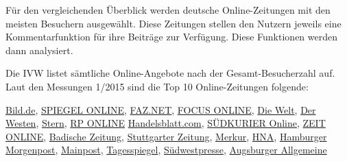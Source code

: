 Für den vergleichenden Überblick werden deutsche Online-Zeitungen mit den meisten Besuchern
ausgewählt. Diese Zeitungen stellen den Nutzern jeweils eine Kommentarfunktion für ihre Beiträge zur Verfügung. 
Diese Funktionen werden dann analysiert. 
  
Die IVW listet sämtliche Online-Angebote nach der Gesamt-Besucherzahl auf.
Laut den Messungen 1/2015 sind die \glqq Top 10 Online-Zeitungen\grqq\- folgende:

\href{http://www.Bild.de}{Bild.de},
\href{http://www.spiegel.de}{SPIEGEL ONLINE}, 
\href{http://www.FAZ.NET}{FAZ.NET},
\href{http://www.focus.de}{FOCUS ONLINE},
\href{http://www.welt.de}{Die Welt}, 
\href{http://www.derwesten.de}{Der Westen},
\href{http://www.stern.de}{Stern},
\href{http://www.rp-online.de}{RP ONLINE}
\href{http://www.Handelsblatt.com}{Handelsblatt.com},
\href{http://www.südkurier.de}{SÜDKURIER Online},
\href{http://www.zeit.de}{ZEIT ONLINE}, 
\href{http://www.Badische-Zeitung.de}{Badische Zeitung},
\href{http://www.stuttgarter-zeitung.de}{Stuttgarter Zeitung},
\href{http://www.merkur-online.de}{Merkur},
\href{http://www.hna.de}{HNA},
\href{http://www.mopo.de}{Hamburger Morgenpost},
\href{http://www.mainpost.de}{Mainpost},
\href{http://www.tagesspiegel.de}{Tagesspiegel},
\href{http://www.swp.de}{Südwestpresse},
\href{http://www..de}{Augsburger Allgemeine}



